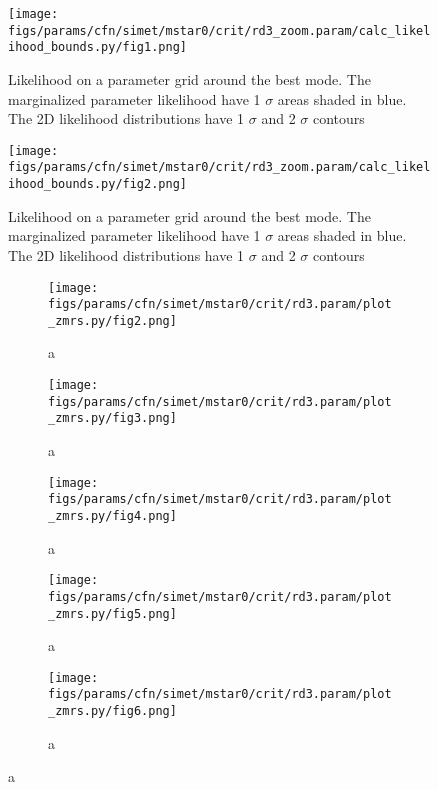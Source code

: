 \documentclass[twocolumn]{article}
\begin{document}
\begin{figure}[H]
  \center\texttt{[image: figs/params/cfn/simet/mstar0/crit/rd3\_zoom.param/calc\_likelihood\_bounds.py/fig1.png]}
  \caption{Likelihood on a parameter grid around the best mode. The marginalized parameter likelihood have
    1 $\sigma$ areas shaded in blue. The 2D likelihood distributions have 1 $\sigma$  and 2 $\sigma$ contours}
  \label{fig:basic_rd:likelihood}
\end{figure}

\begin{figure}[H]
  \center\texttt{[image: figs/params/cfn/simet/mstar0/crit/rd3\_zoom.param/calc\_likelihood\_bounds.py/fig2.png]}
  \caption{Likelihood on a parameter grid around the best mode. The marginalized parameter likelihood have
    1 $\sigma$ areas shaded in blue. The 2D likelihood distributions have 1 $\sigma$  and 2 $\sigma$ contours}
  \label{fig:basic_rd:likelihood}
\end{figure}

\begin{figure}
  \begin{subfigure}{.5\textwidth}
    \centering\texttt{[image: figs/params/cfn/simet/mstar0/crit/rd3.param/plot\_zmrs.py/fig2.png]}
    \caption{a}
  \end{subfigure}
  \begin{subfigure}{.5\textwidth}
    \centering\texttt{[image: figs/params/cfn/simet/mstar0/crit/rd3.param/plot\_zmrs.py/fig3.png]}
    \caption{a}
  \end{subfigure}
  \begin{subfigure}{.5\textwidth}
    \centering\texttt{[image: figs/params/cfn/simet/mstar0/crit/rd3.param/plot\_zmrs.py/fig4.png]}
    \caption{a}
  \end{subfigure}%
  \begin{subfigure}{.5\textwidth}
    \centering\texttt{[image: figs/params/cfn/simet/mstar0/crit/rd3.param/plot\_zmrs.py/fig5.png]}
    \caption{a}
  \end{subfigure}
  \begin{subfigure}{.5\textwidth}
    \centering\texttt{[image: figs/params/cfn/simet/mstar0/crit/rd3.param/plot\_zmrs.py/fig6.png]}
    \caption{a}
  \end{subfigure}
\end{figure}
\clearpage
\end{document}
